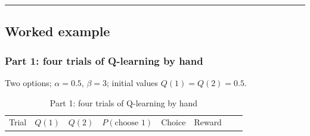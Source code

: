 \begin{center}\rule{0.5\linewidth}{0.5pt}\end{center}


\subsection{Worked example}

\subsubsection{Part 1: four trials of Q-learning by hand}

Two options; \(\alpha = 0.5\), \(\beta = 3\); initial values
\(Q(1) = Q(2) = 0.5\).

\begin{landscape}\small
\begin{longtable}[]{@{}
  >{\raggedright\arraybackslash}p{}
  >{\raggedright\arraybackslash}p{}
  >{\raggedright\arraybackslash}p{}
  >{\raggedright\arraybackslash}p{}
  >{\raggedright\arraybackslash}p{}
  >{\raggedright\arraybackslash}p{}
  >{\raggedright\arraybackslash}p{}
  >{\raggedright\arraybackslash}p{}@{}}
\caption{\centering Part 1: four trials of Q-learning by hand}\tabularnewline
\toprule\noalign{}
\begin{minipage}[b]{\linewidth}\raggedright
Trial
\end{minipage} & \begin{minipage}[b]{\linewidth}\raggedright
\(Q(1)\)
\end{minipage} & \begin{minipage}[b]{\linewidth}\raggedright
\(Q(2)\)
\end{minipage} & \begin{minipage}[b]{\linewidth}\raggedright
\(P(\text{choose } 1)\)
\end{minipage} & \begin{minipage}[b]{\linewidth}\raggedright
Choice
\end{minipage} & \begin{minipage}[b]{\linewidth}\raggedright
Reward
\end{minipage} & \begin{minipage}[b]{\linewidth}\raggedright

\end{minipage}
\end{longtable}
\end{landscape}
